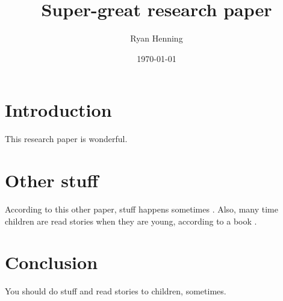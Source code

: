 \documentclass[12pt]{article}
\title{Super-great research paper}
\author{Ryan Henning}
\date{\today}
\begin{document}
\maketitle


\section{Introduction}

This research paper is wonderful.


\section{Other stuff}

According to this other paper, stuff happens sometimes \cite{example_article}. Also, many time children are read stories when they are young, according to a book \cite{example_book}.


\section{Conclusion}

You should do stuff and read stories to children, sometimes.


\pagebreak

{}

\end{document}
